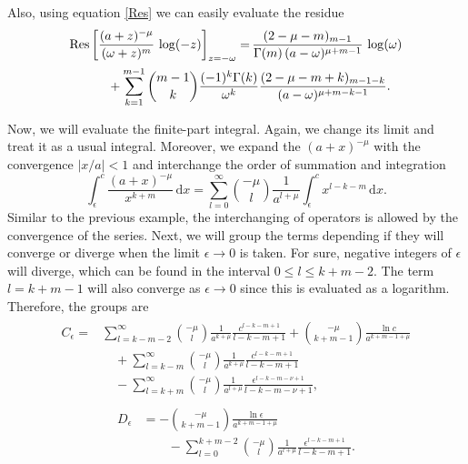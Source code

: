 Also, using equation \eqref{Res} we can easily evaluate the residue
\begin{align}
\begin{split} \label{SC}
    \mathrm{Res} \left[ \frac{(a+z)^{-\mu}}{(\omega+z)^{m}}\, \log(-z)\right]_{z=-\omega} = \,& \frac{(2-\mu-m)_{m-1}}{\Gamma(m) \, (a-\omega)^{\mu+m-1}} \, \log (\omega) \\& \hspace{-40mm} + \sum_{k=1}^{m-1} {m-1 \choose k} \frac{(-1)^k \Gamma(k)}{\omega^k} \frac{(2-\mu-m+k)_{m-1-k}}{(a-\omega)^{\mu+m-k-1}}.
\end{split}
\end{align}

Now, we will evaluate the finite-part integral. Again, we change its limit and treat it as a usual integral. Moreover, we expand the $(a+x)^{-\mu}$ with the convergence $|x/a|<1$ and interchange the order of summation and integration
\begin{equation}
    \int_{\epsilon}^{c} \frac{(a+x)^{-\mu}}{x^{k+m}} \, \mathrm{d}x = \sum_{l=0}^{\infty} \binom{-\mu}{l} \frac{1}{a^{l+\mu}} \int_{\epsilon}^{c} x^{l-k-m} \, \mathrm{d}x.
\end{equation}
Similar to the previous example, the interchanging of operators is allowed by the convergence of the series. Next, we will group the terms depending if they will converge or diverge when the limit $\epsilon \to 0$ is taken. For sure, negative integers of $\epsilon$ will diverge, which can be found in the interval $0 \leq l \leq k+m-2$. The term $l = k+m-1$ will also converge as $\epsilon \to 0$ since this is evaluated as a logarithm. Therefore, the groups are
\begin{align}
\begin{split} 
    C_\epsilon = & \sum_{l=k-m-2}^{\infty} \binom{-\mu}{l} \frac{1}{a^{k+\mu}} \frac{c^{l-k-m+1}}{l-k-m+1} + \binom{-\mu}{k+m-1} \frac{\ln{c}}{a^{k+m-1+\mu}} \\& \quad +\sum_{l=k-m}^{\infty} \binom{-\mu}{l} \frac{1}{a^{k+\mu}} \frac{c^{l-k-m+1}}{l-k-m+1} \\& \quad  -  \sum_{l=k+m}^{\infty} \binom{-\mu}{l} \frac{1}{a^{l+\mu}} \frac{\epsilon^{l-k-m-\nu+1}}{l-k-m-\nu+1},
\end{split}
\end{align}
\begin{align}
\begin{split} 
    D_\epsilon & = - \binom{-\mu}{k+m-1} \frac{\ln{\epsilon}}{a^{k+m-1+\mu}} \\& \qquad - \sum_{l=0}^{k+m-2} \binom{-\mu}{l} \frac{1}{a^{l+\mu}}  \frac{\epsilon^{l-k-m+1}}{l-k-m+1}. 
\end{split}
\end{align}
